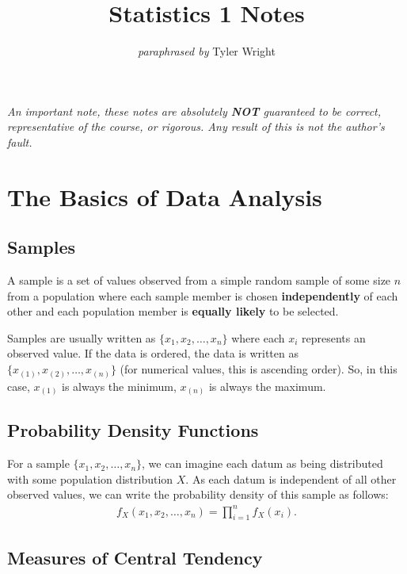 \documentclass[a4paper, 12pt, twoside]{article}
\begin{document}
\title{Statistics 1 Notes}
\date{}
\author{\textit{paraphrased by} Tyler Wright}
\maketitle

\vfill

\textit{An important note, these notes are absolutely \textbf{NOT}
    guaranteed to be correct, representative of the course, or rigorous.
    Any result of this is not the author's fault.}

\newpage

\section{The Basics of Data Analysis}

\subsection{Samples}

A sample is a set of values observed from a simple random sample of
some size $n$ from a population where each sample member is chosen
\textbf{independently} of each other and each population member is
\textbf{equally likely} to be selected.

\vspace{\baselineskip}

Samples are usually written as $\{x_1, x_2, \ldots, x_n\}$ where
each $x_i$ represents an observed value. If the data is ordered,
the data is written as $\{x_{(1)}, x_{(2)}, \ldots, x_{(n)}\}$
(for numerical values, this is ascending order). So, in this
case, $x_{(1)}$ is always the minimum, $x_{(n)}$ is always
the maximum.

\subsection{Probability Density Functions}

For a sample $\{x_1, x_2, \ldots, x_n\}$, we can imagine each
datum as being distributed with some population distribution
$X$. As each datum is independent of all other observed values, we
can write the probability density of this sample as follows:
\begin{align*}
    f_X(x_1, x_2, \ldots, x_n) = \prod_{i = 1}^n f_X(x_i).
\end{align*}

\subsection{Measures of Central Tendency}
\end{document}
